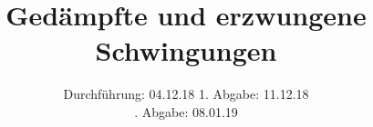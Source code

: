 

\subject{V354}
\title{Gedämpfte und erzwungene Schwingungen}
\date{%
  Durchführung: 04.12.18
  \hspace{3em}
  1. Abgabe: 11.12.18\\
  \hspace{14em}\!\!. Abgabe: 08.01.19
}



\maketitle
\thispagestyle{empty}
\tableofcontents
\newpage







\printbibliography{}


